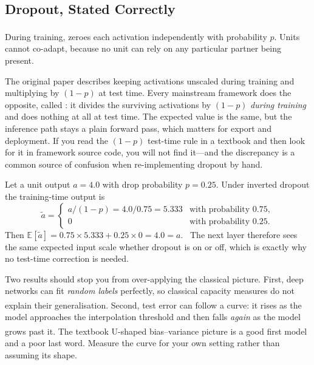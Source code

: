 \subsection{Dropout, Stated Correctly}

During training,  zeroes each activation independently with
probability $p$\textsuperscript{\cite{srivastavaDropoutSimpleWay2014}}. Units
cannot co-adapt, because no unit can rely on any particular partner being
present.

\begin{cautionbox}
The original paper describes keeping activations unscaled during training and
multiplying by $(1-p)$ at test time. Every mainstream framework does the
opposite, called : it divides the surviving
activations by $(1-p)$ \emph{during training} and does nothing at all at test
time. The expected value is the same, but the inference path stays a plain
forward pass, which matters for export and deployment. If you read the $(1-p)$
test-time rule in a textbook and then look for it in framework source code, you
will not find it---and the discrepancy is a common source of confusion when
re-implementing dropout by hand.
\end{cautionbox}

\begin{workedexample}
Let a unit output $a = 4.0$ with drop probability $p = 0.25$. Under inverted
dropout the training-time output is
\[
  \tilde a =
  \begin{cases}
    a/(1-p) = 4.0/0.75 = 5.333 & \text{with probability } 0.75,\\
    0 & \text{with probability } 0.25.
  \end{cases}
\]
Then $\mathbb{E}[\tilde a] = 0.75\times5.333 + 0.25\times0 = 4.0 = a$.
\checkmark\ The next layer therefore sees the same expected input scale whether
dropout is on or off, which is exactly why no test-time correction is needed.
\end{workedexample}

\begin{cautionbox}
Two results should stop you from over-applying the classical picture. First,
deep networks can fit \emph{random labels} perfectly, so classical capacity
measures do not explain their
generalisation\textsuperscript{\cite{zhangUnderstandingDeepLearning2021}}.
Second, test error can follow a  curve: it rises as the
model approaches the interpolation threshold and then falls \emph{again} as the
model grows past
it\textsuperscript{\cite{nakkiranDeepDoubleDescent2020}}. The textbook
U-shaped bias--variance picture is a good first model and a poor last word.
Measure the curve for your own setting rather than assuming its shape.
\end{cautionbox}

